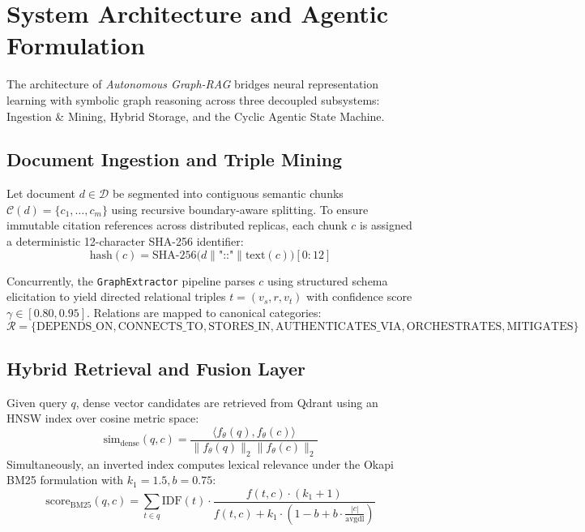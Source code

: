 \section{System Architecture and Agentic Formulation}
\label{sec:architecture}

The architecture of \textit{Autonomous Graph-RAG} bridges neural representation learning with symbolic graph reasoning across three decoupled subsystems: Ingestion \& Mining, Hybrid Storage, and the Cyclic Agentic State Machine.

\subsection{Document Ingestion and Triple Mining}
Let document $d \in \mathcal{D}$ be segmented into contiguous semantic chunks $\mathcal{C}(d) = \{c_1, \dots, c_m\}$ using recursive boundary-aware splitting. To ensure immutable citation references across distributed replicas, each chunk $c$ is assigned a deterministic 12-character SHA-256 identifier:
\begin{equation}
\text{hash}(c) = \text{SHA-256}\Big(d \parallel \text{"::"} \parallel \text{text}(c)\Big)[0:12]
\end{equation}

Concurrently, the \texttt{GraphExtractor} pipeline parses $c$ using structured schema elicitation to yield directed relational triples $t = (v_s, r, v_t)$ with confidence score $\gamma \in [0.80, 0.95]$. Relations are mapped to canonical categories:
\begin{equation}
\mathcal{R} = \{\text{DEPENDS\_ON}, \text{CONNECTS\_TO}, \text{STORES\_IN}, \text{AUTHENTICATES\_VIA}, \text{ORCHESTRATES}, \text{MITIGATES}\}
\end{equation}

\subsection{Hybrid Retrieval and Fusion Layer}
Given query $q$, dense vector candidates are retrieved from Qdrant using an HNSW index over cosine metric space:
\begin{equation}
\text{sim}_{\text{dense}}(q, c) = \frac{\langle f_\theta(q), f_\theta(c) \rangle}{\|f_\theta(q)\|_2 \|f_\theta(c)\|_2}
\end{equation}
Simultaneously, an inverted index computes lexical relevance under the Okapi BM25 formulation with $k_1 = 1.5, b = 0.75$:
\begin{equation}
\text{score}_{\text{BM25}}(q, c) = \sum_{t \in q} \text{IDF}(t) \cdot \frac{f(t, c) \cdot (k_1 + 1)}{f(t, c) + k_1 \cdot \left(1 - b + b \cdot \frac{|c|}{\text{avgdl}}\right)}
\end{equation}

